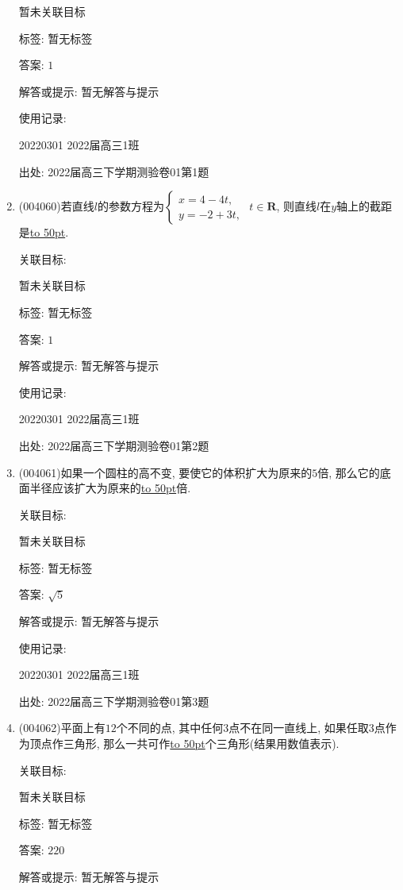 \documentclass[10pt,a4paper]{article}
\newcommand{\blank}[1]{\underline{\hbox to #1pt{}}}
\begin{document}
\begin{enumerate}[1.]
暂未关联目标



标签: 暂无标签

答案: $1$

解答或提示: 暂无解答与提示

使用记录:

20220301	2022届高三1班	


出处: 2022届高三下学期测验卷01第1题
\item { (004060)}若直线$l$的参数方程为$\begin{cases} x=4-4t, \\ y=-2+3t, \end{cases}$ $t\in \mathbf{R}$, 则直线$l$在$y$轴上的截距是\blank{50}.


关联目标:

暂未关联目标



标签: 暂无标签

答案: $1$

解答或提示: 暂无解答与提示

使用记录:

20220301	2022届高三1班	


出处: 2022届高三下学期测验卷01第2题
\item { (004061)}如果一个圆柱的高不变, 要使它的体积扩大为原来的$5$倍, 那么它的底面半径应该扩大为原来的\blank{50}倍.


关联目标:

暂未关联目标



标签: 暂无标签

答案: $\sqrt{5}$

解答或提示: 暂无解答与提示

使用记录:

20220301	2022届高三1班	


出处: 2022届高三下学期测验卷01第3题
\item { (004062)}平面上有$12$个不同的点, 其中任何$3$点不在同一直线上, 如果任取$3$点作为顶点作三角形, 那么一共可作\blank{50}个三角形(结果用数值表示).


关联目标:

暂未关联目标



标签: 暂无标签

答案: $220$

解答或提示: 暂无解答与提示


\end{enumerate}
\end{document}
